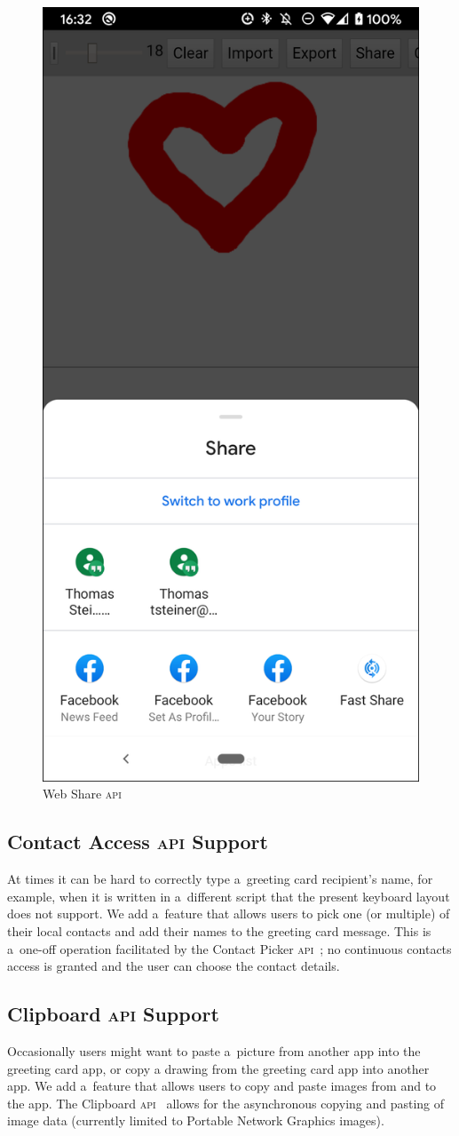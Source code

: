 \documentclass[sigconf]{acmart}
\begin{document}
\begin{figure}[b]
  \includegraphics[width=0.4\columnwidth]{share.png}
  \caption{Web Share \textsc{api}}
  \label{fig:share}
\end{figure}

\subsection{Contact Access \textsc{api} Support}

At times it can be hard to correctly type a~greeting card recipient's name,
for example, when it is written in a~different script
that the present keyboard layout does not support.
We add a~feature that allows users to pick one (or multiple) of their local contacts
and add their names to the greeting card message.
This is a~one-off operation facilitated by the Contact Picker \textsc{api}~\cite{beverloo19};
no continuous contacts access is granted
and the user can choose the contact details.

\subsection{Clipboard \textsc{api} Support}

Occasionally users might want to paste a~picture from another app into the greeting card app,
or copy a drawing from the greeting card app into another app.
We add a~feature that allows users to copy and paste images from and to the app.
The Clipboard \textsc{api}~\cite{kacmarcik19} allows for the asynchronous copying and pasting
of image data (currently limited to Portable Network Graphics images).
\end{document}
